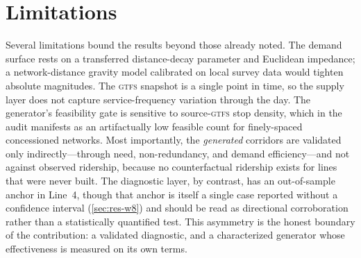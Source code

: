 \section{Limitations}
\label{sec:disc-limitations}

Several limitations bound the results beyond those already noted. The demand surface
rests on a transferred distance-decay parameter and Euclidean impedance; a
network-distance gravity model calibrated on local survey data would tighten absolute
magnitudes. The \textsc{gtfs} snapshot is a single point in time, so the supply layer
does not capture service-frequency variation through the day. The generator's
feasibility gate is sensitive to source-\textsc{gtfs} stop density, which in the audit
manifests as an artifactually low feasible count for finely-spaced concessioned
networks. Most importantly, the \emph{generated} corridors are validated only
indirectly---through need, non-redundancy, and demand efficiency---and not against
observed ridership, because no counterfactual ridership exists for lines that were
never built. The diagnostic layer, by contrast, has an out-of-sample anchor in Line~4,
though that anchor is itself a single case reported without a confidence interval
(\cref{sec:res-w8}) and should be read as directional corroboration rather than a
statistically quantified test. This asymmetry is the honest boundary of the
contribution: a validated diagnostic, and a characterized generator whose
effectiveness is measured on its own terms.

